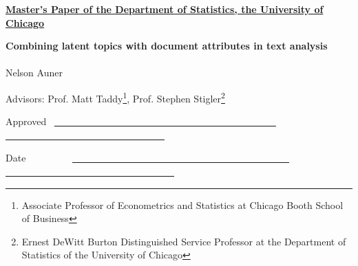 \documentclass[12pt]{article}
\begin{document}
\noindent
\thispagestyle{empty}
\underline{\bf Master's Paper of the Department of Statistics, the
  University of Chicago} 


\vspace{1.8in}
\begin{center}
{\bf\LARGE Combining latent
topics with document attributes in text analysis} \\~\\


\vspace{1.4in}
{\Large Nelson Auner}

\vspace{1.3in}
{\Large Advisors: Prof. Matt Taddy\footnote{Associate Professor of Econometrics and Statistics at Chicago Booth School of Business}, Prof. Stephen Stigler\footnote{Ernest DeWitt Burton Distinguished Service Professor at the Department of Statistics of the University of Chicago} \\{\small }}

\end{center}

\vspace{.6in}
{\Large Approved} ~\underline{~~~~~~~~~~~~~~~~~~~~~~~~~~~~~~~~~~~~~~~~~~~~~~
~~~~~~~~~~~~~~~~~~~~~~~~~~~~~~~~~}

\vspace{.2in}
{\Large Date} ~~~~~~~~~\underline{~~~~~~~~~~~~~~~~~~~~~~~~~~~~~~~~~~~~~~~~~~~~~
~~~~~~~~~~~~~~~~~~~~~~~~~~~~~~~~~~~}


\newpage
\pagestyle{plain}
\setcounter{page}{1}

\begin{abstract}

\vspace{7mm}\noindent 

This paper introduces a variant to existing models of multinomial
regression for text analysis. Using the base model introduced by Taddy
(2013), we extend the data-generating model to incorporate topics not
explained by metadata. In doing so, we seek to increase
the prediction accuracy over existing techniques, bridge the gap between
multinomial regression and standard topic models, and investigate
methods for discovering new topics in a corpus. We explore computational
aspects of our approach, provide software for parallelization of the
algorithm, and conclude by proposing areas of future research.

\end{abstract}
\end{document}
